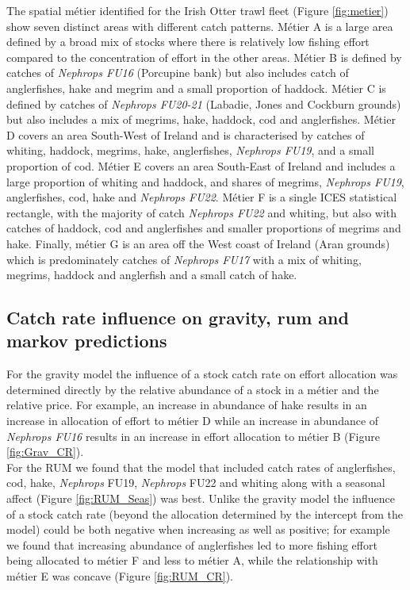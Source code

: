 \documentclass[12pt, halfline, a4paper]{ouparticle}
\begin{document}
The spatial métier identified for the Irish Otter trawl fleet (Figure
\ref{fig:metier}) show seven distinct areas with different catch patterns.
Métier A is a large area defined by a broad mix of stocks where there is
relatively low fishing effort compared to the concentration of effort in the
other areas. Métier B is defined by catches of \textit{Nephrops FU16}
(Porcupine bank) but also includes catch of anglerfishes, hake and megrim and a
small proportion of haddock. Métier C is defined by catches of \textit{Nephrops
	FU20-21} (Labadie, Jones and Cockburn grounds) but also includes a mix
of megrims, hake, haddock, cod and anglerfishes. Métier D covers an area
South-West of Ireland and is characterised by catches of whiting, haddock,
megrims, hake, anglerfishes, \textit{Nephrops FU19}, and a small proportion of
cod. Métier E covers an area South-East of Ireland and includes a large
proportion of whiting and haddock, and shares of megrims, \textit{Nephrops
	FU19}, anglerfishes, cod, hake and \textit{Nephrops FU22}.  Métier F is
a single ICES statistical rectangle, with the majority of catch
\textit{Nephrops FU22} and whiting, but also with catches of haddock, cod and
anglerfishes and smaller proportions of megrims and hake. Finally, métier G is
an area off the West coast of Ireland (Aran grounds) which is predominately
catches of \textit{Nephrops FU17} with a mix of whiting, megrims, haddock and
anglerfish and a small catch of hake.

\subsection{Catch rate influence on gravity, rum and markov predictions}

For the gravity model the influence of a stock catch rate on effort allocation
was determined directly by the relative abundance of a stock in a métier and
the relative price. For example, an increase in abundance of hake results in an
increase in allocation of effort to métier D while an increase in abundance of
\textit{Nephrops FU16} results in an increase in effort allocation to métier B
(Figure \ref{fig:Grav_CR}). \\

For the RUM we found that the model that included catch rates of anglerfishes,
cod, hake, \textit{Nephrops} FU19, \textit{Nephrops} FU22 and whiting along
with a seasonal affect (Figure \ref{fig:RUM_Seas}) was best. Unlike the gravity
model the influence of a stock catch rate (beyond the allocation determined by
the intercept from the model) could be both negative when increasing as well as
positive; for example we found that increasing abundance of anglerfishes led to
more fishing effort being allocated to métier F and less to métier A, while the
relationship with métier E was concave (Figure \ref{fig:RUM_CR}). \\
\end{document}
